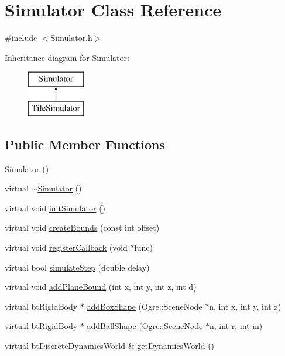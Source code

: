 \hypertarget{classSimulator}{\section{Simulator Class Reference}
\label{classSimulator}
}


{\ttfamily \#include $<$Simulator.\-h$>$}

Inheritance diagram for Simulator\-:\begin{figure}[H]
\begin{center}
\leavevmode
\includegraphics[height=2.000000cm]{classSimulator}
\end{center}
\end{figure}
\subsection*{Public Member Functions}
\begin{DoxyCompactItemize}
\item 
\hyperlink{classSimulator_a031573bfcfe2e0f5c9539bcc1c7fc5d9}{Simulator} ()
\item 
virtual \hyperlink{classSimulator_a0f49aa04f42060a785adf77346b9de9f}{$\sim$\-Simulator} ()
\item 
virtual void \hyperlink{classSimulator_a6c0dd9962f860e93925a3e4ae8809655}{init\-Simulator} ()
\item 
virtual void \hyperlink{classSimulator_a38c86f8f73f8aa4dac13555692c67eca}{create\-Bounds} (const int offset)
\item 
virtual void \hyperlink{classSimulator_ad35820d07373b65deef417c8c18b7d13}{register\-Callback} (void $\ast$func)
\item 
virtual bool \hyperlink{classSimulator_a6abe3ee406909ab7f03930dfa537a42b}{simulate\-Step} (double delay)
\item 
virtual void \hyperlink{classSimulator_a043aa34df7dbd5046ed56407ba9b44de}{add\-Plane\-Bound} (int x, int y, int z, int d)
\item 
virtual bt\-Rigid\-Body $\ast$ \hyperlink{classSimulator_ad9e33ec74ec54f65077de1c8dc28fd5b}{add\-Box\-Shape} (Ogre\-::\-Scene\-Node $\ast$n, int x, int y, int z)
\item 
virtual bt\-Rigid\-Body $\ast$ \hyperlink{classSimulator_a22d1288cafb5a83c3c5c95fc5b58efbb}{add\-Ball\-Shape} (Ogre\-::\-Scene\-Node $\ast$n, int r, int m)
\item 
virtual bt\-Discrete\-Dynamics\-World \& \hyperlink{classSimulator_a5da2770c96b18da1e5ce575b4652528e}{get\-Dynamics\-World} ()
\end{DoxyCompactItemize}
